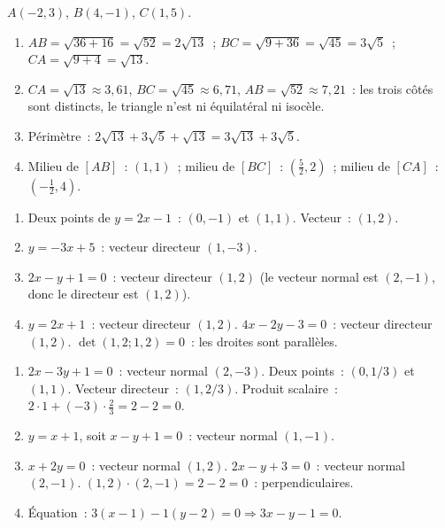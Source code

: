 
$A(-2,3)$, $B(4,-1)$, $C(1,5)$.
\begin{enumerate}
  \item $AB=\sqrt{36+16}=\sqrt{52}=2\sqrt{13}$~;
        $BC=\sqrt{9+36}=\sqrt{45}=3\sqrt{5}$~;
        $CA=\sqrt{9+4}=\sqrt{13}$.
  \item $CA=\sqrt{13}\approx3{,}61$, $BC=\sqrt{45}\approx6{,}71$, $AB=\sqrt{52}\approx7{,}21$~: les trois c\^ot\'es sont distincts,
        le triangle n'est ni \'equilat\'eral ni isoc\`ele.
  \item P\'erim\`etre~: $2\sqrt{13}+3\sqrt{5}+\sqrt{13}=3\sqrt{13}+3\sqrt{5}$.
  \item Milieu de $[AB]$~: $(1,1)$~; milieu de $[BC]$~: $(\frac{5}{2},2)$~;
        milieu de $[CA]$~: $(-\frac{1}{2},4)$.
\end{enumerate}


\begin{enumerate}
  \item Deux points de $y=2x-1$~: $(0,-1)$ et $(1,1)$. Vecteur~: $(1,2)$.\checkmark
  \item $y=-3x+5$~: vecteur directeur $(1,-3)$.
  \item $2x-y+1=0$~: vecteur directeur $(1,2)$
        (le vecteur normal est $(2,-1)$, donc le directeur est $(1,2)$).
  \item $y=2x+1$~: vecteur directeur $(1,2)$.
        $4x-2y-3=0$~: vecteur directeur $(1,2)$.
        $\det(1,2;1,2)=0$~: les droites sont parall\`eles.\checkmark
\end{enumerate}


\begin{enumerate}
  \item $2x-3y+1=0$~: vecteur normal $(2,-3)$.
        Deux points~: $(0,1/3)$ et $(1,1)$. Vecteur directeur~: $(1,2/3)$.
        Produit scalaire~: $2\cdot1+(-3)\cdot\frac{2}{3}=2-2=0$.\checkmark
  \item $y=x+1$, soit $x-y+1=0$~: vecteur normal $(1,-1)$.
  \item $x+2y=0$~: vecteur normal $(1,2)$.
        $2x-y+3=0$~: vecteur normal $(2,-1)$.
        $(1,2)\cdot(2,-1)=2-2=0$~: perpendiculaires.\checkmark
  \item \'Equation~: $3(x-1)-1(y-2)=0\Rightarrow3x-y-1=0$.
\end{enumerate}

